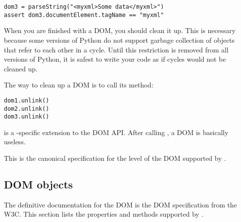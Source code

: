 \begin{verbatim}
dom3 = parseString("<myxml>Some data</myxml>")
assert dom3.documentElement.tagName == "myxml"
\end{verbatim}

When you are finished with a DOM, you should clean it up.  This is
necessary because some versions of Python do not support garbage
collection of objects that refer to each other in a cycle.  Until this
restriction is removed from all versions of Python, it is safest to
write your code as if cycles would not be cleaned up.

The way to clean up a DOM is to call its  method:

\begin{verbatim}
dom1.unlink()
dom2.unlink()
dom3.unlink()
\end{verbatim}

 is a -specific extension to the DOM
API.  After calling , a DOM is basically useless.

\begin{seealso}
           {This is the canonical specification for the level of the
            DOM supported by .}
\end{seealso}


\subsection{DOM objects \label{dom-objects}}

The definitive documentation for the DOM is the DOM specification from
the W3C.  This section lists the properties and methods supported by
.

